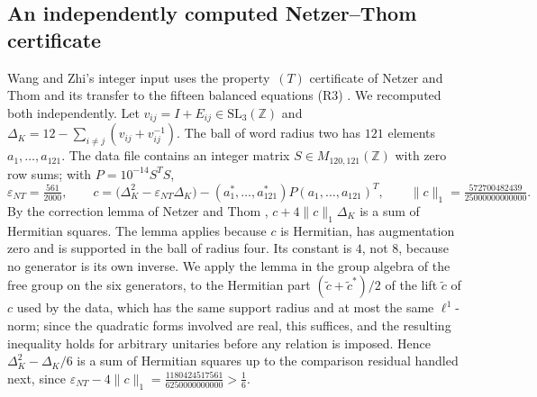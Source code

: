\documentclass[11pt]{article}
\newcommand{\eps}{\varepsilon}
\begin{document}
\subsection*{An independently computed Netzer--Thom certificate}\label{app:nt}
Wang and Zhi's integer input uses the property~$(T)$ certificate of Netzer and Thom \cite{NetzerThom15} and its transfer to the fifteen balanced equations (R3) \cite[Lemma~3.3]{WangZhi26}.  We recomputed both independently.  Let $v_{ij}=I+E_{ij}\in\mathrm{SL}_3(\mathbb Z)$ and $\Delta_K=12-\sum_{i\ne j}(v_{ij}+v_{ij}^{-1})$.  The ball of word radius two has $121$ elements $a_1,\dots,a_{121}$.  The data file contains an integer matrix $S\in M_{120,121}(\mathbb Z)$ with zero row sums; with $P=10^{-14}S^TS$,
\[
 \eps_{NT}=\tfrac{561}{2000},\qquad c=\bigl(\Delta_K^2-\eps_{NT}\Delta_K\bigr)-(a_1^*,\dots,a_{121}^*)P(a_1,\dots,a_{121})^T,\qquad \|c\|_1=\tfrac{572700482439}{25000000000000}.
\]
By the correction lemma of Netzer and Thom \cite[Lemma~2.1]{NetzerThom15}, $c+4\|c\|_1\Delta_K$ is a sum of Hermitian squares.  The lemma applies because $c$ is Hermitian, has augmentation zero and is supported in the ball of radius four.  Its constant is $4$, not $8$, because no generator is its own inverse.  We apply the lemma in the group algebra of the free group on the six generators, to the Hermitian part $(\tilde c+\tilde c^*)/2$ of the lift $\tilde c$ of $c$ used by the data, which has the same support radius and at most the same $\ell^1$-norm; since the quadratic forms involved are real, this suffices, and the resulting inequality holds for arbitrary unitaries before any relation is imposed.  Hence $\Delta_K^2-\Delta_K/6$ is a sum of Hermitian squares up to the comparison residual handled next, since $\eps_{NT}-4\|c\|_1=\tfrac{1180424517561}{6250000000000}>\tfrac16$.
\end{document}
